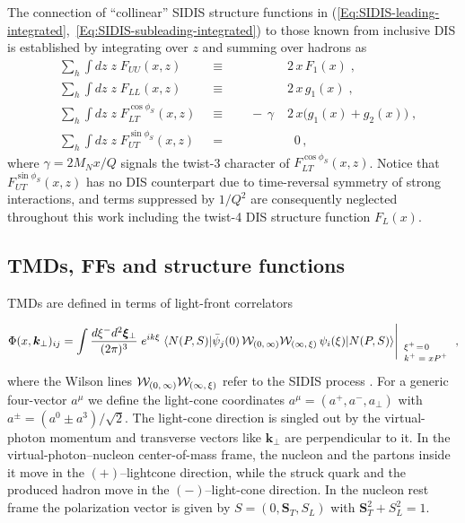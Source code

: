 \documentclass[a4paper,11pt]{article}
\newcommand{\be}{\begin{equation}}
\newcommand{\ee}{\end{equation}}
\newcommand{\la}{\langle}
\newcommand{\ra}{\rangle}
\newcommand{\with}[3]{{\Biggl|{\renewcommand*{\arraystretch}{0.8}
	\begin{array}{l}
	\phantom{X}\\
	\mbox{\scriptsize ${#1}$}\\
	\mbox{\scriptsize ${#2}$}\\
	\mbox{\scriptsize #3}\end{array}}}}
\def\bfkperp{{\bm k}_\perp}
\begin{document}
The connection of ``collinear'' SIDIS structure functions
in (\ref{Eq:SIDIS-leading-integrated},~\ref{Eq:SIDIS-subleading-integrated})
to those known from inclusive DIS is established by integrating over $z$
and summing over hadrons as
\begin{subequations}\begin{alignat}{4}
	&\sum\limits_h\int d z\;z\;F_{UU}(x,z)
	&\equiv	&&	& 2\,x\,F_1(x) \;,
	\label{Eq:DIS-F1}\\ %
	&\sum\limits_h\int d z\;z\;F_{LL}(x,z)
	&\equiv && 	& 2\,x\,g_1(x) \;,
	\label{Eq:DIS-g1}\\ %
	&\sum\limits_h\int d z\;z\;F_{LT}^{\cos\phi_S}(x,z) \;\;
	&\equiv && \;\; -\,\gamma\; & 2\,x\biggl(g_1(x)+g_2(x)\biggr) \;,
	\label{Eq:DIS-gT}\\ %
	&\sum\limits_h\int d z\;z\;F_{UT}^{\sin\phi_S}(x,z)
	&=      && 	    & \;\; 0 \, ,
	\label{Eq:DIS-zero}
\end{alignat}\end{subequations}
where $\gamma=2M_Nx/Q$ signals the twist-3 character of $F_{LT}^{\cos\phi_S}(x,z)$.
Notice that $F_{UT}^{\sin\phi_S}(x,z)$ has no DIS counterpart due to time-reversal
symmetry of strong interactions, and terms suppressed by $1/Q^2$ are
consequently neglected throughout this work including the twist-4 DIS
structure function $F_L(x)$.


\subsection{TMDs, FFs and structure functions}
\label{Sec-2.2:def-TMD-FF}

TMDs are defined in terms of light-front correlators
\be\label{Eq:correlator}
    	\Phi(x,\bfkperp)_{ij} = \int\frac{ d \xi^- d^2{\bm \xi}_\perp}{(2\pi)^3}
	\;e^{ik\xi}\;\la N(P,S)|\bar\psi_j(0)\,{\cal W}_{(0,\,\infty)}
	{\cal W}_{(\infty,\,\xi)}\,\psi_i(\xi)|N(P,S)\ra
    	\with{ }{\xi^+\!=\!0}{$k^+ = xP^+$}  \, ,
	\ee
where the Wilson lines  {${\cal W}_{(0,\,\infty)}{\cal W}_{(\infty,\,\xi)}$}
refer to the SIDIS process
\cite{Collins:2002kn}. For a generic four-vector $a^\mu$ we define
the light-cone coordinates $a^\mu=(a^+,a^-,a_\perp)$ with
$a^\pm=(a^0\pm a^3)/\sqrt{2}$.
The light-cone direction is singled out by the virtual-photon momentum
and transverse vectors like $\bfkperp$ are perpendicular to it. In the
virtual-photon--nucleon center-of-mass frame, the nucleon and the partons
inside it move in the $(+)$--lightcone direction, while the struck
quark and the produced hadron move in the $(-)$--light-cone direction.
In the nucleon rest frame the polarization vector is given by
$S=(0,{\bm S}_T,S_L)$ with ${\bm S}_T^2+S_L^2=1$.
\end{document}
